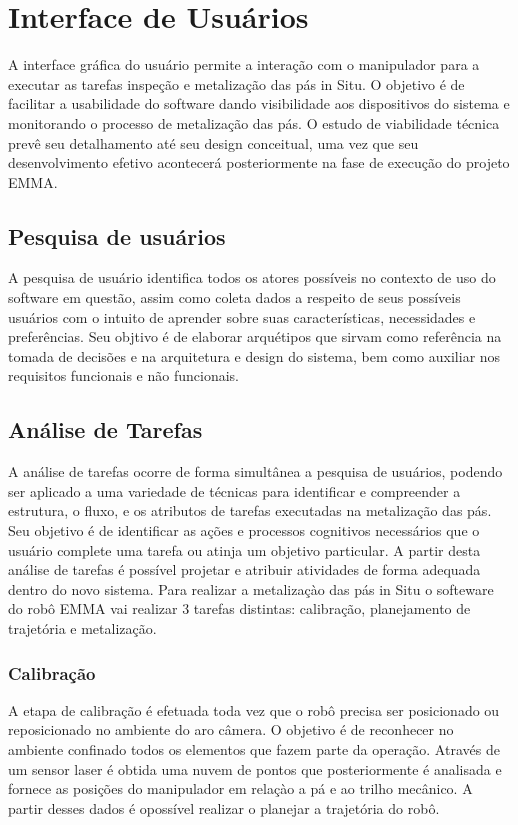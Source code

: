  \section{Interface de Usuários}\label{sec::interface} 

A interface gráfica do usuário permite a interação com o manipulador para a
executar as tarefas inspeção e metalização das pás in Situ. O objetivo é de facilitar a usabilidade do software dando
visibilidade aos dispositivos do sistema e monitorando o processo de metalização das pás.
O estudo de viabilidade técnica prevê seu detalhamento até seu design
conceitual, uma vez que seu desenvolvimento efetivo acontecerá posteriormente na
fase de execução do projeto EMMA.


\subsection{Pesquisa de usuários}
A pesquisa de usuário identifica todos os atores possíveis no contexto de uso do
software em questão, assim como coleta dados a respeito de seus possíveis usuários com o intuito de 
aprender sobre suas características, necessidades e preferências. Seu objtivo é
de elaborar arquétipos que sirvam como referência na tomada de decisões e na
arquitetura e design do sistema, bem como auxiliar nos requisitos funcionais e
não funcionais.


\subsection{Análise de Tarefas}
A análise de tarefas ocorre de forma simultânea a pesquisa de usuários, podendo
ser aplicado a uma variedade de técnicas para identificar e compreender a estrutura, o fluxo, 
e os atributos de tarefas executadas na metalização das pás. Seu objetivo é de
identificar as ações e processos cognitivos necessários que o usuário complete
uma tarefa ou atinja um objetivo particular. A partir desta análise de tarefas é
possível projetar e atribuir atividades de forma adequada dentro do novo sistema.
Para realizar a metalizaçào das pás in Situ o softeware do robô EMMA vai
realizar 3 tarefas distintas: calibração, planejamento de trajetória e
metalização.


\subsubsection{Calibração}
A etapa de calibração é efetuada toda vez que o robô precisa ser
posicionado ou reposicionado no ambiente do aro câmera. O objetivo é de
reconhecer no ambiente confinado todos os elementos que fazem parte da
operação. Através de um sensor laser é obtida uma nuvem de pontos que
posteriormente é analisada e fornece as posições do manipulador em relaçào a pá
e ao trilho mecânico. A partir desses dados é opossível realizar o planejar a
trajetória do robô.


